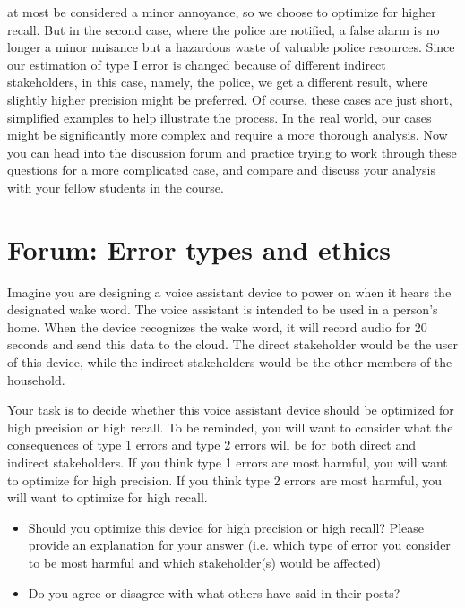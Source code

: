 at most be considered a minor annoyance, so we
choose to optimize for higher recall.
But in the second case, where the police are notified,
a false alarm is no longer a minor nuisance
but a hazardous waste of valuable police resources.
Since our estimation of type I error is changed
because of different indirect stakeholders,
in this case, namely, the police, we get a different result,
where slightly higher precision might be preferred.
Of course, these cases are just short, simplified examples to help
illustrate the process.
In the real world, our cases might be significantly more complex
and require a more thorough analysis.
Now you can head into the discussion forum
and practice trying to work through these questions for a more
complicated case, and compare and discuss
your analysis with your fellow students in the course.

\section{Forum: Error types and ethics}

Imagine you are designing a voice assistant device to power on when it hears the designated wake word. The voice assistant is intended to be used in a person’s home. When the device recognizes the wake word, it will record audio for 20 seconds and send this data to the cloud. The direct stakeholder would be the user of this device, while the indirect stakeholders would be the other members of the household. 

Your task is to decide whether this voice assistant device should be optimized for high precision or high recall. To be reminded, you will want to consider what the consequences of type 1 errors and type 2 errors will be for both direct and indirect stakeholders. If you think type 1 errors are most harmful, you will want to optimize for high precision. If you think type 2 errors are most harmful, you will want to optimize for high recall.

\begin{itemize}
  \item Should you optimize this device for high precision or high recall? Please provide an explanation for your answer (i.e. which type of error you consider to be most harmful and which stakeholder(s) would be affected)
  \item Do you agree or disagree with what others have said in their posts?
\end{itemize}



